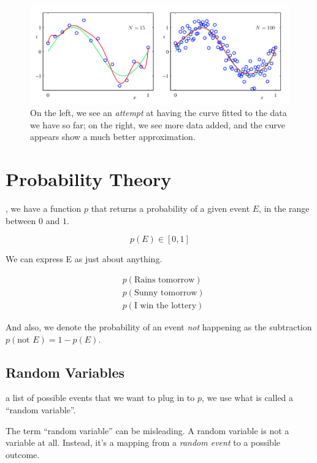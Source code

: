 \documentclass{tufte-handout}
\begin{document}
\begin{figure}[h]
  \includegraphics[width=\linewidth]{moredata.png}%
  \caption{On the left, we see an \emph{attempt} at having the curve fitted to
  the data we have so far; on the right, we see more data added, and the curve
  appears show a much better approximation.}
\end{figure}

\break

\section{Probability Theory}

, we have a function $p$ that returns a probability
of a given event $E$, in the range between $0$ and $1$.

\begin{equation}
  p(E) \in [0, 1]
\end{equation}

We can express E as just about anything.

\begin{align}
  & p(\text{Rains tomorrow}) \\
  & p(\text{Sunny tomorrow}) \\
  & p(\text{I win the lottery})
\end{align}

And also, we denote the probability of an event \emph{not} happening as the
subtraction $p(\text{not } E) = 1 - p(E)$.

\subsection{Random Variables}

 a list of possible events that we want to plug in to
$p$, we use what is called a ``random variable''.

The term ``random variable'' can be misleading. A random variable is not a
variable at all. Instead, it's a mapping from a \emph{random event} to a
possible outcome.
\end{document}
